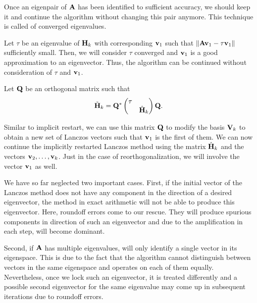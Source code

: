 \begin{remark}
  Once an eigenpair of $\mathbf A$ has been identified to sufficient
  accuracy, we should keep it and continue the algorithm without
  changing this pair anymore. This technique is called
   of converged eigenvalues.

  Let $\tau$ be an eigenvalue of $\mathbf H_k$ with corresponding
   $\mathbf v_1$ such that
  $\lVert\mathbf A\mathbf v_1 - \tau\mathbf v_1\rVert$ sufficiently small. Then, we will
  consider $\tau$ converged and $\mathbf v_1$ is a good approximation to an
  eigenvector. Thus, the algorithm can be continued without
  consideration of $\tau$ and $\mathbf v_1$.

  Let $\mathbf Q$ be an orthogonal matrix such that
  \begin{gather}
    \tilde {\mathbf H}_k = \mathbf Q^*
    \begin{pmatrix}
      \tau \\&\hat {\mathbf H}_k
    \end{pmatrix} \mathbf Q.
  \end{gather}

  Similar to implicit restart, we can use this matrix $\mathbf Q$ to
  modify the basis $\mathbf V_k$ to obtain a new set of Lanczos vectors
  such that $\mathbf v_1$ is the first of them. We can now continue the
  implicitly restarted Lanczos method using the matrix $\hat{\mathbf H}_k$
  and the vectors $\mathbf v_2,\dots,\mathbf v_k$. Just in the case of
  reorthogonalization, we will involve the vector $\mathbf v_1$ as well.
\end{remark}

\begin{remark}
  We have so far neglected two important cases. First, if the initial
  vector of the Lanczos method does not have any component in the
  direction of a desired eigenvector, the method in exact arithmetic
  will not be able to produce this eigenvector. Here, roundoff errors
  come to our rescue. They will produce spurious components in
  direction of such an eigenvector and due to the amplification in
  each step, will become dominant.
  
  Second, if $\mathbf A$ has multiple eigenvalues,
   will only identify a single vector in its
  eigenspace. This is due to the fact that the algorithm cannot
  distinguish between vectors in the same eigenspace and operates on
  each of them equally. Nevertheless, once we lock such an
  eigenvector, it is treated differently and a possible second
  eigenvector for the same eigenvalue may come up in subsequent
  iterations due to roundoff errors.
\end{remark}


